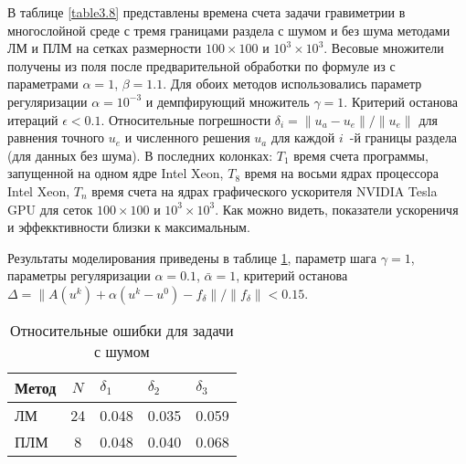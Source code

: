 В таблице \ref{table3.8} представлены времена счета задачи гравиметрии в многослойной среде с тремя границами раздела с шумом и без шума методами ЛМ и ПЛМ на сетках размерности $100\times100$ и $10^3\times10^3$. Весовые множители получены из поля после предварительной обработки по формуле из  \cite{AkMarMis2013} с параметрами $\alpha=1$, $\beta=1.1$.  Для обоих методов использовались параметр регуляризации $\alpha=10^{-3}$ и демпфирующий множитель $\gamma=1$. Критерий останова итераций $\epsilon < 0.1$. Относительные погрешности $\delta_i=\|u_a-u_e\|/\|u_e\|$ для равнения точного $u_e$ и численного решения $u_a$ для каждой $i$~-й границы раздела (для данных без шума). В последних колонках: $T_1 $ время счета программы, запущенной на одном ядре Intel Xeon, $T_8$ время на восьми ядрах процессора Intel Xeon, $T_n$ время счета на ядрах графического ускорителя NVIDIA Tesla GPU для сеток $100\times100$ и $10^3\times10^3$. Как можно видеть, показатели ускореничя и эффекктивности близки к максимальным.

Результаты моделирования приведены в таблице \ref{table3.9}, параметр шага $\gamma=1$, параметры регуляризации $\alpha=0.1$, $\bar{\alpha}=1$, критерий останова $\Delta=\|A(u^k)+\alpha(u^k-u^0)-f_\delta\|/\|f_\delta\|<0.15$.
\begin{table}[H]
	\centering
	\renewcommand{\arraystretch}{1.5}
	\caption{Относительные ошибки для задачи с шумом}
	\label{table3.9}
	\begin{tabular}{|l|c|l|l|l|}
		\hline
		\textbf{Метод} & \textbf{$N$} & \textbf{$\delta_1$} & \textbf{$\delta_2$} & \textbf{$\delta_3$} \\ \hline
		ЛМ                                                    & 24                            & 0.048                                & 0.035                                & 0.059                                \\ \hline
		ПЛМ                                                   & 8                             & 0.048                                & 0.040                                & 0.068                                \\ \hline
	\end{tabular}
\end{table}

